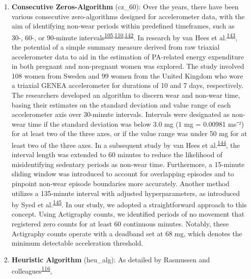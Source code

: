 \documentclass[
  10pt,
]{scrbook}
\let\originaltextbf\textbf
\renewcommand{\textbf}[1]{\textcolor{color1}{\textsf{\originaltextbf{#1}}}}
\begin{document}
\begin{enumerate}
\def\labelenumi{\arabic{enumi}.}
\item
  \textsf{\textbf{Consecutive Zeros-Algorithm}} (\textsf{cz\_60}): Over
  the years, there have been various consecutive zero-algorithms
  designed for accelerometer data, with the aim of identifying non-wear
  periods within predefined timeframes, such as 30-, 60-, or 90-minute
  intervals\textsuperscript{\protect\hyperlink{ref-choi_validation_2011}{105},\protect\hyperlink{ref-hecht_methodology_2009}{110},\protect\hyperlink{ref-troiano_physical_2008}{142}}.
  In research by van Hees et
  al.\textsuperscript{\protect\hyperlink{ref-van_hees_estimation_2011}{143}},
  the potential of a simple summary measure derived from raw triaxial
  accelerometer data to aid in the estimation of PA-related energy
  expenditure in both pregnant and non-pregnant women was explored. The
  study involved 108 women from Sweden and 99 women from the United
  Kingdom who wore a triaxial GENEA accelerometer for durations of 10
  and 7 days, respectively. The researchers developed an algorithm to
  discern wear and non-wear time, basing their estimates on the standard
  deviation and value range of each accelerometer axis over 30-minute
  intervals. Intervals were designated as non-wear time if the standard
  deviation was below 3.0 mg (1 mg = 0.00981 ms⁻²) for at least two of
  the three axes, or if the value range was under 50 mg for at least two
  of the three axes. In a subsequent study by van Hees et
  al.\textsuperscript{\protect\hyperlink{ref-hees_separating_2013}{144}},
  the interval length was extended to 60 minutes to reduce the
  likelihood of misidentifying sedentary periods as non-wear time.
  Furthermore, a 15-minute sliding window was introduced to account for
  overlapping episodes and to pinpoint non-wear episode boundaries more
  accurately. Another method utilizes a 135-minute interval with
  adjusted hyperparameters, as introduced by Syed et
  al.\textsuperscript{\protect\hyperlink{ref-syed_evaluating_2020}{145}}.
  In our study, we adopted a straightforward approach to this concept.
  Using Actigraphy counts, we identified periods of no movement that
  registered zero counts for at least 60 continuous minutes. Notably,
  these Actigraphy counts operate with a deadband set at 68 mg, which
  denotes the minimum detectable acceleration threshold.
\item
  \textsf{\textbf{Heuristic Algorithm}} (\textsf{heu\_alg}): As detailed
  by Rasmussen and
  colleagues\textsuperscript{\protect\hyperlink{ref-rasmussen_short-term_2020}{116}},

\end{enumerate}
\end{document}
